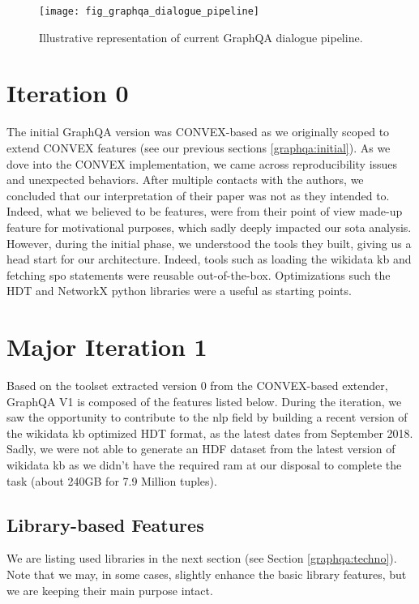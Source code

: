 \begin{figure}
    \centering
    \texttt{[image: fig\_graphqa\_dialogue\_pipeline]}
    \caption{Illustrative representation of current GraphQA dialogue pipeline.}
    \label{fig:fig_graphqa_dialogue_pipeline}
\end{figure}

\section{Iteration 0}
The initial GraphQA version was CONVEX-based as we originally scoped to extend CONVEX features (see our previous sections \ref{graphqa:initial}). As we dove into the CONVEX implementation, we came across reproducibility issues and unexpected behaviors. After multiple contacts with the authors, we concluded that our interpretation of their paper was not as they intended to. Indeed, what we believed to be features, were from their point of view made-up feature for motivational purposes, which sadly deeply impacted our \gls{sota} analysis. However, during the initial phase, we understood the tools they built, giving us a head start for our architecture. Indeed, tools such as loading the \gls{wikidata} \gls{kb} and fetching \gls{spo} statements were reusable out-of-the-box. Optimizations such the HDT \autocite{website:hdt} and NetworkX \autocite{paper:SciPyProceedings_11} python libraries were a useful as starting points. 

\section{Major Iteration 1}
\label{graphqa:graphqa1}
Based on the toolset extracted version 0 from the CONVEX-based extender, GraphQA V1 is composed of the features listed below. During the iteration, we saw the opportunity to contribute to the \gls{nlp} field by building a recent version of the \gls{wikidata} \gls{kb} optimized HDT \autocite{website:hdt} format, as the latest dates from September 2018. Sadly, we were not able to generate an HDF dataset from the latest version of \gls{wikidata} \gls{kb} as we didn't have the required ram at our disposal to complete the task (about 240GB for 7.9 Million tuples).

\subsection{Library-based Features}
\label{graphqa:libraries1}
We are listing used libraries in the next section (see Section \ref{graphqa:techno}). Note that we may, in some cases, slightly enhance the basic library features, but we are keeping their main purpose intact.


